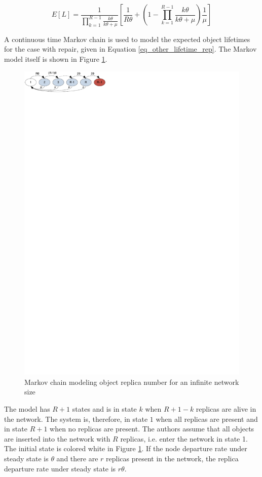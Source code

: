 \documentclass[10pt,a4paper,conference]{IEEEtran}
\begin{document}
\begin{equation} \label{eq_other_lifetime_rep}
    E[L] = \frac{1}{\prod_{k=1}^{R-1}\frac{k\theta}{k\theta+\mu}} \left[\frac{1}{R\theta} + \left(1 - \prod_{k=1}^{R-1}\frac{k\theta}{k\theta + \mu}\right)\frac{1}{\mu}\right]
\end{equation}

A continuous time Markov chain is used to model the expected object lifetimes for the case with repair, given in Equation \eqref{eq_other_lifetime_rep}. The Markov model itself is shown in Figure \ref{fig_other_markov_chain}.

\begin{figure}[htbp]
 \centering
 \includegraphics[clip=true, viewport=0.0cm 27.5cm 8.0cm 30.0cm, width=0.7\columnwidth]{inifinite_network_chain}
 \caption{Markov chain modeling object replica number for an infinite network size}
 \label{fig_other_markov_chain}
\end{figure}

The model has $R+1$ states and is in state $k$ when $R+1-k$ replicas are alive in the network. The system is, therefore, in state $1$ when all replicas are present and in state $R+1$ when no replicas are present. The authors assume that all objects are inserted into the network with $R$ replicas, i.e. enter the network in state 1. The initial state is colored white in Figure \ref{fig_other_markov_chain}. If the node departure rate under steady state is $\theta$ and there are $r$ replicas present in the network, the replica departure rate under steady state is $r\theta$.
\end{document}
